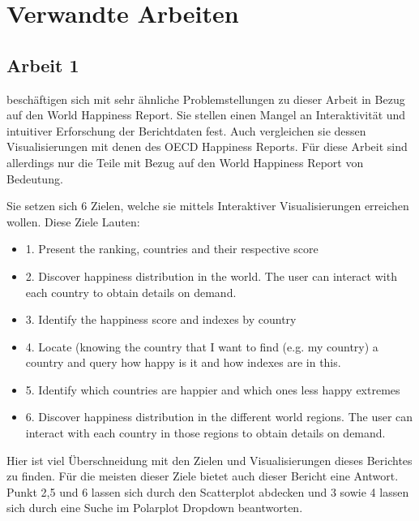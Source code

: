 \section{Verwandte Arbeiten}

\subsection{Arbeit 1}
\textcite{bazurto2019} beschäftigen sich mit sehr ähnliche Problemstellungen zu dieser Arbeit in Bezug auf den World Happiness Report. Sie stellen einen Mangel an Interaktivität und intuitiver Erforschung der Berichtdaten fest. Auch vergleichen sie dessen Visualisierungen mit denen des OECD Happiness Reports. Für diese Arbeit sind allerdings nur die Teile mit Bezug auf den World Happiness Report von Bedeutung. 

Sie setzen sich 6 Zielen, welche sie mittels Interaktiver Visualisierungen erreichen wollen. Diese Ziele Lauten:

\begin{itemize}
\item 1. Present the ranking, countries and their respective score

\item 2. Discover happiness distribution in the world. The user can interact with each country to obtain details on demand.
\item 3. Identify the happiness score and indexes by country

\item 4. Locate (knowing the country that I want to find (e.g. my country) a country and query how happy is it and how indexes are in this.

\item 5. Identify which countries are happier and which ones less happy extremes

\item 6. Discover happiness distribution in the different world regions. The user can interact with each country in those regions to obtain details on demand.
\end{itemize}

Hier ist viel Überschneidung mit den Zielen und Visualisierungen dieses Berichtes zu finden. Für die meisten dieser Ziele bietet auch dieser Bericht eine Antwort. Punkt 2,5 und 6 lassen sich durch den Scatterplot abdecken und 3 sowie 4 lassen sich durch eine Suche im Polarplot Dropdown beantworten. \\

